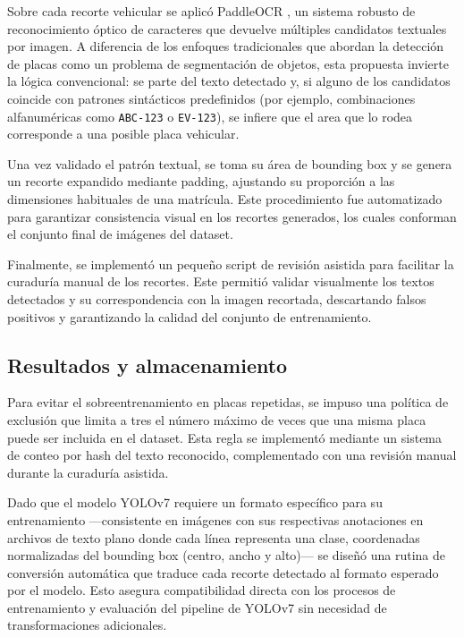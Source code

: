\documentclass[conference]{IEEEtran}
\begin{document}
Sobre cada recorte vehicular se aplicó PaddleOCR \cite{paddleocr}, un sistema robusto de reconocimiento óptico de caracteres que devuelve múltiples candidatos textuales por imagen. A diferencia de los enfoques tradicionales que abordan la detección de placas como un problema de segmentación de objetos, esta propuesta invierte la lógica convencional: se parte del texto detectado y, si alguno de los candidatos coincide con patrones sintácticos predefinidos (por ejemplo, combinaciones alfanuméricas como \texttt{ABC-123} o \texttt{EV-123}), se infiere que el area que lo rodea corresponde a una posible placa vehicular.

Una vez validado el patrón textual, se toma su área de bounding box y se genera un recorte expandido mediante padding, ajustando su proporción a las dimensiones habituales de una matrícula. Este procedimiento fue automatizado para garantizar consistencia visual en los recortes generados, los cuales conforman el conjunto final de imágenes del dataset.

Finalmente, se implementó un pequeño script de revisión asistida para facilitar la curaduría manual de los recortes. Este permitió validar visualmente los textos detectados y su correspondencia con la imagen recortada, descartando falsos positivos y garantizando la calidad del conjunto de entrenamiento.



\subsection{Resultados y almacenamiento}

Para evitar el sobreentrenamiento en placas repetidas, se impuso una política de exclusión que limita a tres el número máximo de veces que una misma placa puede ser incluida en el dataset. Esta regla se implementó mediante un sistema de conteo por hash del texto reconocido, complementado con una revisión manual durante la curaduría asistida.


Dado que el modelo YOLOv7 requiere un formato específico para su entrenamiento —consistente en imágenes con sus respectivas anotaciones en archivos de texto plano donde cada línea representa una clase, coordenadas normalizadas del bounding box (centro, ancho y alto)— se diseñó una rutina de conversión automática que traduce cada recorte detectado al formato esperado por el modelo. Esto asegura compatibilidad directa con los procesos de entrenamiento y evaluación del pipeline de YOLOv7 sin necesidad de transformaciones adicionales.
\end{document}
